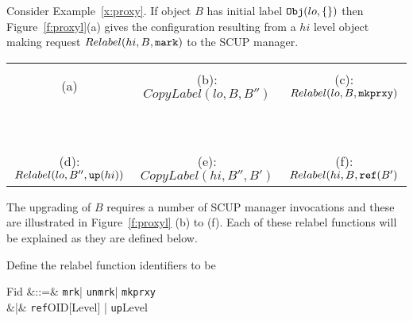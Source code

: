 \newcommand{\upgrade}{\mbox{\tt mkprxy}}
\newcommand{\marku}{\mbox{\tt mrk}}
\newcommand{\unmark}{\mbox{\tt unmrk}}
\newcommand{\refp}{\mbox{\tt ref}}
\newcommand{\strip}{\mbox{\tt strip}}
\newcommand{\lup}{\mbox{\tt up}}

\begin{ex}
Consider Example~\ref{x:proxy}. If object $B$ has initial label
$\mbox{\tt Obj}(lo,\{\})$ then Figure~\ref{f:proxyl}(a) gives the
configuration resulting from a $hi$ level object making request
$Relabel(hi,B,{\tt mark})$ to the SCUP manager.
\begin{figure*}[htb]
\newcommand{\sixtt}{\tiny\tt}
\begin{center}
\begin{tabular}{ccc}
 & &\\
(a) 
& (b): $CopyLabel(lo,B,B'')$ 
& (c): $Relabel(lo,B,\upgrade)$
\\~\\
~~~~~~~~~~ & &\\
(d): $Relabel(lo,B'',\lup(hi))$
& (e): $CopyLabel(hi,B'',B')$
& (f): $Relabel(hi,B,\refp(B')$
\end{tabular}
\end{center}
\caption{Relabeling using Proxy Labels\label{f:proxyl}}
\end{figure*}
The upgrading of $B$ requires a number of SCUP manager invocations and 
these are illustrated in Figure~\ref{f:proxyl} (b) to (f).
Each of these relabel  functions will be explained as they are defined
below.
\end{ex}


Define the relabel function identifiers to be
\begin{syntax}
Fid &::=& \marku | \unmark | \upgrade \\
    &|& \refp\ldata OID[Level] \rdata 
               | \lup\ldata Level\rdata
\end{syntax}

